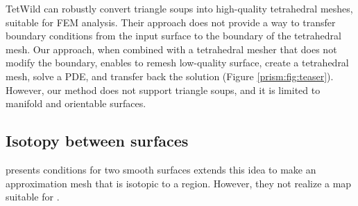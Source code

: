

TetWild \cite{hu2018tetrahedral,Hu:2019:fTetWild}
can robustly convert triangle soups into high-quality tetrahedral meshes, suitable for FEM analysis. Their approach does not provide a way to transfer boundary conditions from the input surface to the boundary of the tetrahedral mesh. Our approach, when combined with a tetrahedral mesher that does not modify the boundary, enables to remesh low-quality surface, create a tetrahedral mesh, solve a PDE, and transfer back the solution (Figure \ref{prism:fig:teaser}). However, our method does not support triangle soups, and it is limited to manifold and orientable surfaces.

\subsection{Isotopy between surfaces}

 presents conditions for two  smooth surfaces  \cite{mandad2015isotopic} extends this idea to make an approximation mesh that is isotopic to a region. However, they  not realize a map suitable for .
